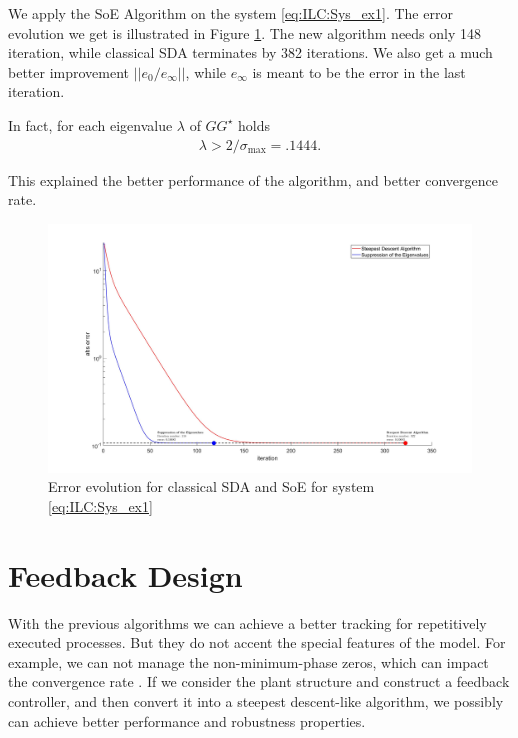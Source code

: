 \begin{exam}
	We apply the SoE Algorithm on the system \eqref{eq:ILC:Sys_ex1}. The error evolution we get is illustrated in Figure \ref{img:ILC:SDAvsSE}. The new algorithm needs only 148 iteration, while classical SDA terminates by 382 iterations. We also get a much better improvement $||e_0/e_\infty||$, while $e_\infty$  is meant to be the error in the last iteration. 
	
	In fact, for each eigenvalue $\lambda$ of $G G^\star$ holds 
	\begin{align}
	\lambda > 2/\sigma_{\max} = .1444. 
	\end{align}
	
	This explained the better performance of the algorithm, and better convergence rate.  		
	\begin{figure}[ht]
		\centering
		\includegraphics[width=\textwidth]{fig/Ex1_SDAvsES.jpg}
		\caption{Error evolution for classical SDA and SoE for system \eqref{eq:ILC:Sys_ex1}}
		\label{img:ILC:SDAvsSE}
	\end{figure}
	
\end{exam}

\section{Feedback Design}

With the previous algorithms we can achieve a better tracking for repetitively executed processes.  But they do not accent the special features of the model. For example, we can not manage the non-minimum-phase zeros, which can impact the convergence rate \cite{ILC}. 
If we consider the plant structure and construct a feedback controller, and then convert it into a steepest descent-like algorithm, we possibly can achieve better performance and robustness properties. 


